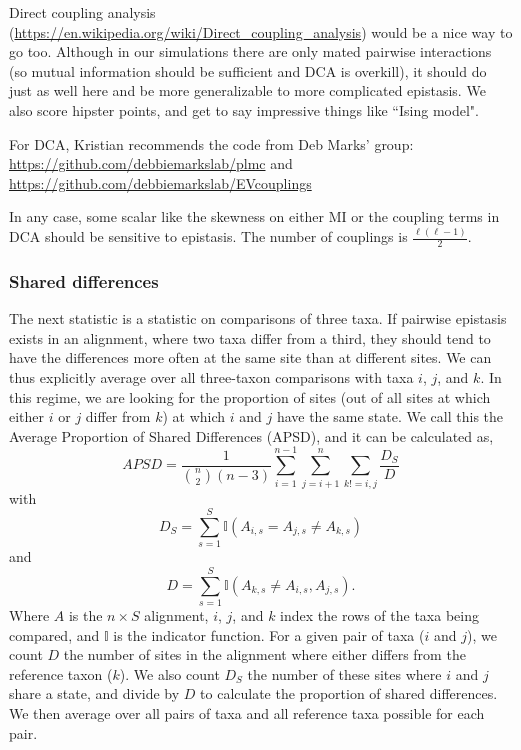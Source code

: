 \documentclass[11pt]{article}
\begin{document}
Direct coupling analysis (\url{https://en.wikipedia.org/wiki/Direct_coupling_analysis}) would be a nice way to go too.
Although in our simulations there are only mated pairwise interactions (so mutual information should be sufficient and DCA is overkill), it should do just as well here and be more generalizable to more complicated epistasis.
We also score hipster points, and get to say impressive things like ``Ising model".

For DCA, Kristian recommends the code from Deb Marks' group: \url{https://github.com/debbiemarkslab/plmc} and \url{https://github.com/debbiemarkslab/EVcouplings}

In any case, some scalar like the skewness on either MI or the coupling terms in DCA should be sensitive to epistasis.
The number of couplings is $\frac{\ell(\ell-1)}{2}$.

\subsubsection*{Shared differences}
The next statistic is a statistic on comparisons of three taxa.
If pairwise epistasis exists in an alignment, where two taxa differ from a third, they should tend to have the differences more often at the same site than at different sites.
We can thus explicitly average over all three-taxon comparisons with taxa $i$, $j$, and $k$.
In this regime, we are looking for the proportion of sites (out of all sites at which either $i$ or $j$ differ from $k$) at which $i$ and $j$ have the same state.
We call this the Average Proportion of Shared Differences (APSD), and it can be calculated as,
\[
APSD = \frac{1}{\binom{n}{2}(n-3)} \sum_{i=1}^{n-1} \sum_{j=i+1}^n \sum_{k != i,j} \frac{D_S}{D}
\]
with
\[
D_S = \sum_{s=1}^S \mathbb{I}(A_{i,s} = A_{j,s} \neq A_{k,s})
\]
and
\[
D = \sum_{s=1}^S \mathbb{I}(A_{k,s} \neq A_{i,s},A_{j,s}).
\]
Where $A$ is the $n \times S$ alignment, $i$, $j$, and $k$ index the rows of the taxa being compared, and $\mathbb{I}$ is the indicator function.
For a given pair of taxa ($i$ and $j$), we count $D$ the number of sites in the alignment where either differs from the reference taxon ($k$).
We also count $D_S$ the number of these sites where $i$ and $j$ share a state, and divide by $D$ to calculate the proportion of shared differences.
We then average over all pairs of taxa and all reference taxa possible for each pair.
\end{document}
